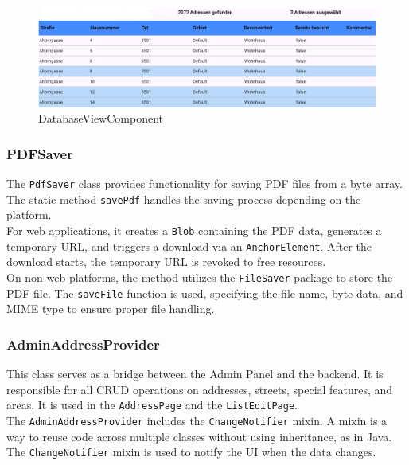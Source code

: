 \begin{figure}[H]
    \centering
    \includegraphics[width=0.9\linewidth]{images/AdminPanel/DataBaseViewComponent.png}
    \caption{DatabaseViewComponent}
\end{figure}


\subsubsection{PDFSaver}
The \texttt{PdfSaver} class provides functionality for saving PDF files from a byte array. The static method \texttt{savePdf} handles the saving process depending on the platform. \\

For web applications, it creates a \texttt{Blob} containing the PDF data, generates a temporary URL, and triggers a download via an \texttt{AnchorElement}. After the download starts, the temporary URL is revoked to free resources.\\

On non-web platforms, the method utilizes the \texttt{FileSaver} package to store the PDF file. The \texttt{saveFile} function is used, specifying the file name, byte data, and MIME type to ensure proper file handling.


\newpage
  \subsubsection{AdminAddressProvider}
  This class serves as a bridge between the Admin Panel and the backend. It is responsible for all CRUD operations on addresses, streets, special features, and areas. It is used in the \texttt{AddressPage} and the \texttt{ListEditPage}. \\

  The \texttt{AdminAddressProvider} includes the \texttt{ChangeNotifier} mixin. A mixin is a way to reuse code across multiple classes without using inheritance, as in Java. \autocite{dart.dev} The \texttt{ChangeNotifier} mixin is used to notify the UI when the data changes. \autocite{flutter.dev}  \\
  

